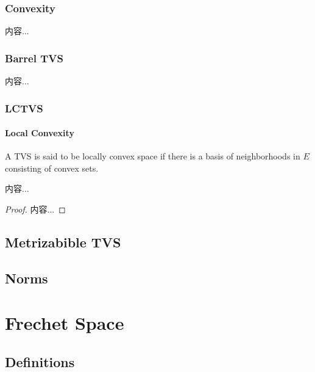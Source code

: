 \documentclass[Total.tex]{subfiles}
\begin{document}
			\subsection{Convexity}
				\begin{Def}
					内容...
				\end{Def}
			\subsection{Barrel TVS}
				\begin{Def}
					内容...
				\end{Def}
			\subsection{LCTVS}
				\subsubsection{Local Convexity}
				\begin{Def}
					A TVS is said to be locally convex space if there is a basis of neighborhoods in $E$ consisting of convex sets.
				\end{Def}
				\begin{proposition}
					内容...
				\end{proposition}
				\begin{proof}
					内容...
				\end{proof}
		\section{Metrizabible TVS}
		\section{Norms}
	\chapter{Frechet Space}
	\section{Definitions}
\end{document}
